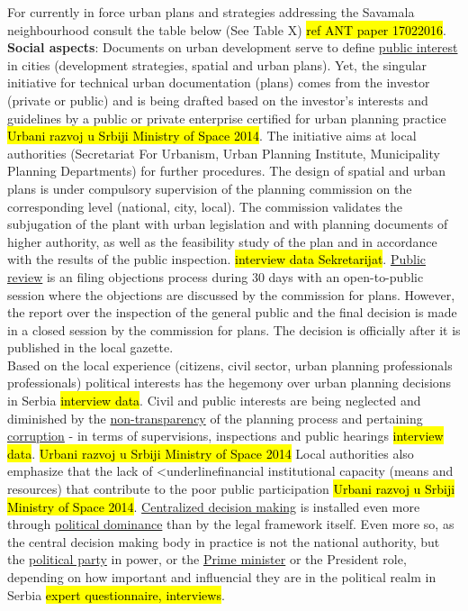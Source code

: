 \documentclass[11pt]{report}
\begin{document}
\begin{itemize}
For currently in force urban plans and strategies addressing the Savamala neighbourhood consult the table below (See Table X) \hl{ref ANT paper 17022016}. 
\\
\textbf{Social aspects}:
Documents on urban development serve to define  \underline{public interest} in cities (development strategies, spatial and urban plans).
Yet, the singular initiative for technical urban documentation (plans) comes from the investor (private or public) and is being drafted based on the investor's interests and guidelines by a public or private enterprise certified for urban planning practice \hl{Urbani razvoj u Srbiji Ministry of Space 2014}. The initiative aims at local authorities (Secretariat For Urbanism, Urban Planning Institute, Municipality Planning Departments) for further procedures.
The design of spatial and urban plans is under compulsory supervision of the planning commission on the corresponding level (national, city, local). The commission validates the subjugation of the plant with urban legislation and with planning documents of higher authority, as well as the feasibility study of the plan and in accordance with the results of the public inspection.
\hl{interview data Sekretarijat}.  
\underline{Public review} is an filing objections process during 30 days with an open-to-public session  where the objections are discussed by the commission for plans. However, the report over the inspection of the general public and the final decision is made in a closed session by the commission for plans. The decision is officially after it is published in the local gazette.
\\
Based on the local experience (citizens, civil sector, urban planning professionals professionals) political interests has the hegemony over urban planning decisions in Serbia \hl{interview data}. Civil and public interests are being neglected and diminished by the \underline{non-transparency} of the planning process and pertaining \underline{corruption} - in terms of supervisions, inspections and public hearings \hl{interview data}.
\hl{Urbani razvoj u Srbiji Ministry of Space 2014}
Local authorities also emphasize that the lack of <underline{financial institutional capacity} (means and resources) that contribute to the poor public participation \hl{Urbani razvoj u Srbiji Ministry of Space 2014}. \underline{Centralized decision making} is installed even more through \underline{political dominance} than by the legal framework itself.
Even more so, as the central decision making body in practice is not the national authority, but the  \underline{political party} in power, or the  \underline{Prime minister} or the President role, depending on how important and influencial they are in the political realm in Serbia \hl{expert questionnaire, interviews}.

\end{itemize}
\end{document}
